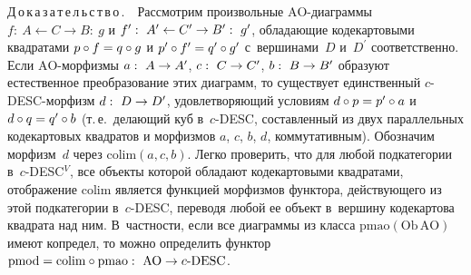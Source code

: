\begin{multicols}{2}
 \noindent
 Д\,о\,к\,а\,з\,а\,т\,е\,л\,ь\,с\,т\,в\,о\,.\ \ Рассмотрим произвольные
 $\mathrm{AO}$-диа\-грам\-мы $f:\ A\leftarrow C\to B:\ g$ и $f^\prime:\
A^\prime\hm\leftarrow C^\prime\hm\to B^\prime:\ g^\prime$, обладающие
кодекартовыми квад\-ратами $p\circ f \hm= q \circ g$ и $p^\prime \circ
f^\prime\hm= q^\prime \circ g^\prime$ с~вершинами~$D$ и~$D^\prime$
соответственно. Если $\mathrm{AO}$-мор\-физ\-мы $a:\ A\hm\to A^\prime$, $c:\ C\hm\to
C^\prime$, $b:\ B\hm\to B^\prime$ образуют естественное преобразование этих
диаграмм, то существует единственный $c$-DESC-мор\-физм $d:\ D\hm\to
D^\prime$, удов\-ле\-тво\-ря\-ющий условиям $d\circ p \hm= p^\prime \circ a$ и $d\circ
q \hm= q^\prime \circ b$ (т.\,е.\ делающий куб в~$c$-DESC, составленный из
двух параллельных кодекартовых квадратов и морфизмов $a$, $c$, $b$, $d$,
коммутативным). Обозначим морфизм~$d$ через $\mathrm{colim}(a, c, b)$. Легко
проверить, что для любой подкатегории в~$c$-DESC$^V$, все объекты которой
обладают кодекартовыми квадратами, отображение $\mathrm{colim}$ является функцией
морфизмов функтора, действующего из этой подкатегории в~$c$-DESC,
переводя любой ее объект в~вершину кодекартова квадрата над ним.
В~частности, если все диаграммы из класса $\mathrm{pmao}(\mathrm{Ob}\, \mathrm{AO})$ имеют
копредел, то можно определить функтор $\mathrm{pmod} \hm= \mathrm{colim} \circ \mathrm{pmao}:\
\mathrm{AO}\hm\to c\mbox{-}\mathrm{DESC}$.

\vspace*{9pt}
 \begin{center}
 \mbox{%
 \epsfxsize=48.551mm
 }
 \end{center}
 \vspace*{9pt}



\end{multicols}
